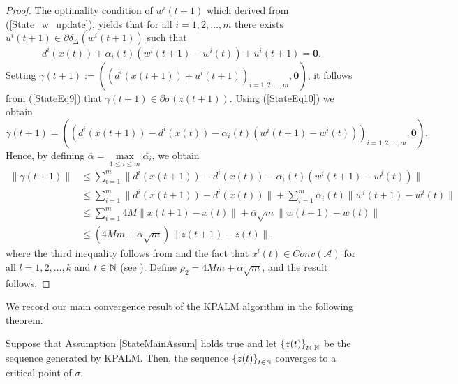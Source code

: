 \begin{proof}
The optimality condition of $w^i(t+1)$ which derived from (\ref{State_w_update}), yields that for all $i=1, 2, \ldots ,m$ there exists $u^i(t+1) \in \partial \delta_{\Delta}(w^i(t+1))$ such that
\begin{equation}
	d^i(x(t)) + \alpha_i(t) \left( w^i(t+1) - w^i(t) \right) + u^i(t+1) = \mathbf{0} . \label{StateEq10}
\end{equation}
Setting $\gamma(t+1) := \left( \left( d^i(x(t+1)) + u^i(t+1) \right)_{i=1,2, \ldots ,m}, \mathbf{0} \right)$, it follows from (\ref{StateEq9})  that $\gamma(t+1) \in \partial \sigma(z(t+1))$. Using (\ref{StateEq10}) we obtain
\begin{equation*}
	\gamma(t+1) = \left( \left( d^i(x(t+1)) - d^i(x(t)) - \alpha_i(t)(w^i(t+1) - w^i(t)) \right)_{i=1,2, \ldots, m}, \mathbf{0} \right).
\end{equation*}
Hence, by defining $\overline{\alpha} = \max\limits_{1 \leq i \leq m} \overline{\alpha_i}$, we obtain
\begin{align*}
	\| \gamma(t+1) \|
	& \leq \sum\limits_{i=1}^{m} \| d^i(x(t+1)) - d^i(x(t)) - \alpha_i(t) \left( w^i(t+1) - w^i(t) \right) \| \\
	& \leq \sum\limits_{i=1}^{m} \| d^i(x(t+1)) - d^i(x(t)) \| + \sum\limits_{i=1}^{m} \alpha_i(t) \| w^i(t+1) - w^i(t) \| \\
	& \leq \sum\limits_{i=1}^{m} 4M \| x(t+1) - x(t) \| +  \overline{\alpha} \sqrt{m}\|w(t+1) - w(t)\| \\
	& \leq \left( 4Mm + \overline{\alpha}\sqrt{m} \right) \|z(t+1) - z(t)\| , 
\end{align*}
where the third inequality follows from  and the fact that $x^l(t) \in Conv(\mathcal{A})$ for all $l=1,2,\ldots,k$ and $t \in \mathbb{N}$ (see ). Define $\rho_2 = 4Mm + \overline{\alpha}\sqrt{m}$, and the result follows.
\end{proof}

We record our main convergence result of the KPALM algorithm in the following theorem.

\begin{theorem} \label{KPALM_conv_thrm}
Suppose that Assumption \ref{StateMainAssum} holds true and let $\left\lbrace z(t) \right\rbrace_{t \in \mathbb{N}}$ be the sequence generated by KPALM. Then, the sequence $\left\lbrace z(t) \right\rbrace_{t \in \mathbb{N}}$ converges to a critical point of $\sigma$.
\end{theorem}

